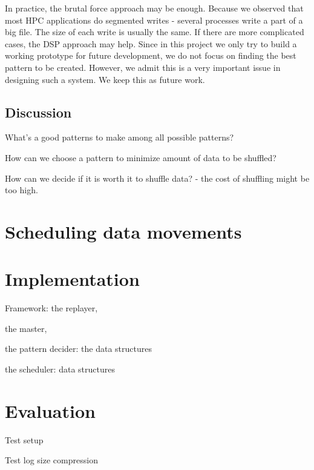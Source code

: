 \documentclass{acm_proc_article-sp}
\begin{document}
In practice, the brutal force approach
may be enough. Because we observed that 
most HPC applications do segmented writes
- several processes write a part of a big
file. The size of each write is usually
the same. If there are more complicated
cases, the DSP approach may help. 
Since in this project we only try to build
a working prototype for future development,
we do not focus on finding the best pattern
to be created. However, we admit this is
a very important issue in designing such a
system. We keep this as future work.

\subsection{Discussion}
What's a good patterns to make among 
all possible patterns?

How can we choose a pattern to minimize
amount of data to be shuffled?

How can we decide if it is worth it to
shuffle data? - the cost of shuffling might be
too high.




\section{Scheduling data movements}
\label{sec:scheduling-data-movements}


\section{Implementation}
\label{sec:implementation}

Framework: 
the replayer, 

the master, 

the pattern decider: the data structures

the scheduler: data structures


\section{Evaluation}
\label{sec:evaluation}
Test setup

Test log size compression
\end{document}
